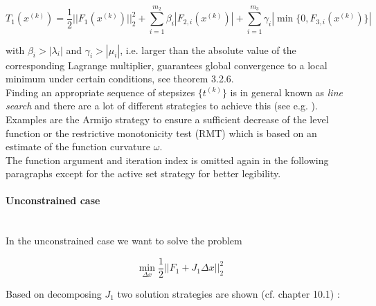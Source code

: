 \documentclass{scrartcl}[12pt, halfparskip]
\numberwithin{equation}{section}
\numberwithin{figure}{section}
\numberwithin{table}{section}
\begin{document}
\begin{equation}
	T_1(x^{(k)}) = \frac{1}{2} || F_1(x^{(k)}) ||_2^2 + \sum_{i=1}^{m_2} \beta_i | F_{2,i}(x^{(k)}) | + \sum_{i=1}^{m_3} \gamma_i | \min\{0,F_{3,i}(x^{(k)})\} |
\end{equation}

with $\beta_i > |\lambda_i|$ and $\gamma_i > |\mu_i|$, i.e. larger than the absolute value of the corresponding Lagrange multiplier, guarantees global convergence to a local minimum under certain conditions, see \cite{diss_bock} theorem 3.2.6. \\
Finding an appropriate sequence of stepsizes $\{ t^{(k)} \}$ is in general known as \textit{line search} and there are a lot of different strategies to achieve this (see e.g. \cite{nonlinear_optimiziation_wright}). Examples are the Armijo strategy to ensure a sufficient decrease of the level function or the restrictive monotonicity test (RMT) \cite{bock2000_RMT} which is based on an estimate of the function curvature $\omega$. \\

The function argument and iteration index is omitted again in the following paragraphs except for the active set strategy for better legibility.

\paragraph{Unconstrained case}\mbox{}\\
In the unconstrained case we want to solve the problem

\begin{equation}
\min_{\Delta x} \frac{1}{2} || F_1 + J_1 \Delta x ||_2^2
\label{eq:numerical_solution_LSQ}
\end{equation}

Based on decomposing $J_1$ two solution strategies are shown (cf. \cite{nonlinear_optimiziation_wright} chapter 10.1) :
\end{document}
